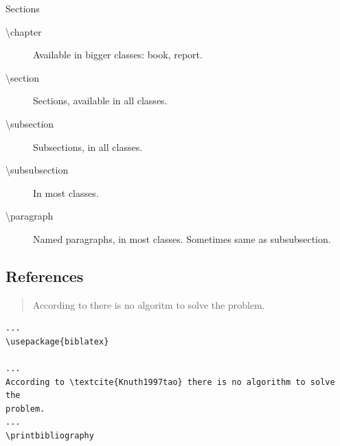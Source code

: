 \begin{frame}
  \begin{block}{Sections}
    \begin{description}
      \item[\textbackslash chapter] Available in bigger classes:
        book, report.

      \item[\textbackslash section] Sections, available in all classes.

      \item[\textbackslash subsection] Subsections, in all classes.

      \item[\textbackslash subsubsection] In most classes.

      \item[\textbackslash paragraph] Named paragraphs, in most classes. 
        Sometimes same as subsubsection.

    \end{description}
  \end{block}
\end{frame}

%
%
%
%


\subsection{References}

\begin{frame}[fragile]
  \begin{example}[Output]
    \begin{quote}
      According to \textcite{Knuth1997tao} there is no algoritm to solve the 
      problem.
    \end{quote}
  \end{example}

  \pause

  \begin{example}[Input]
    \begin{lstlisting}
...
\usepackage{biblatex}

...
According to \textcite{Knuth1997tao} there is no algorithm to solve the 
problem.
...
\printbibliography
    \end{lstlisting}
  \end{example}
\end{frame}

